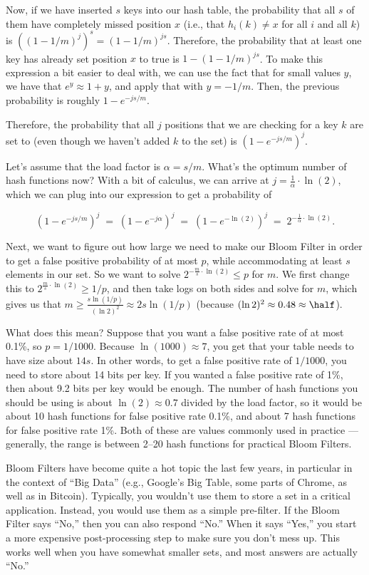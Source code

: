 Now, if we have inserted $s$ keys into our hash table, the probability
that all $s$ of them have completely missed position $x$ (i.e., that
$h_i(k) \neq x$ for all $i$ and all $k$) is $((1-1/m)^j)^s = (1-1/m)^{js}$.
Therefore, the probability that at least one key has already set
position $x$ to true is $1-(1-1/m)^{js}$.
To make this expression a bit easier to deal with, we can use the fact
that for small values $y$, we have that $e^y \approx 1+y$, and apply
that with $y= -1/m$. Then, the previous probability is roughly
$1-e^{-js/m}$.

Therefore, the probability that all $j$ positions that we are checking
for a key $k$ are set to  (even though we haven't added $k$
to the set) is $(1-e^{-js/m})^j$.

Let's assume that the load factor is $\alpha = s/m$. What's the
optimum number of hash functions now? With a bit of calculus, we can
arrive at $j = \frac{1}{\alpha} \cdot \ln(2)$, which we can plug into
our expression to get a probability of 

\[
(1-e^{-js/m})^j
\; = \; (1-e^{-j \alpha})^j
\; = \; (1-e^{- \ln(2)})^j
\; = \; 2^{-\frac{1}{\alpha} \cdot \ln(2)}.
\]

Next, we want to figure out how large we need to make our Bloom Filter
in order to get a false positive probability of at most $p$, while
accommodating at least $s$ elements in our set. So we want to solve
$2^{-\frac{m}{s} \cdot \ln(2)} \leq p$ for $m$. We first change this
to $2^{\frac{m}{s} \cdot \ln(2)} \geq 1/p$, and then take logs on both
sides and solve for $m$, which gives us that
$m \geq \frac{s \ln(1/p)}{(\ln 2)^2} \approx 2s \ln(1/p)$ (because
$(\ln 2)^2 \approx 0.48 \approx \half$).

What does this mean? Suppose that you want a false positive rate of at
most 0.1\%, so $p = 1/1000$. Because $\ln(1000) \approx 7$, you get
that your table needs to have size about $14s$. In other words, to get
a false positive rate of $1/1000$, you need to store about 14 bits per
key. If you wanted a false positive rate of 1\%, then about 9.2 bits
per key would be enough. The number of hash functions you should be
using is about $\ln(2) \approx 0.7$ divided by the load factor, so it
would be about 10 hash functions for false positive rate 0.1\%, and
about 7 hash functions for false positive rate 1\%. Both of these are
values commonly used in practice --- generally, the range is between
2--20 hash functions for practical Bloom Filters.

Bloom Filters have become quite a hot topic the last few years, in
particular in the context of ``Big Data'' (e.g., Google's Big Table,
some parts of Chrome, as well as in Bitcoin). Typically, you wouldn't
use them to store a set in a critical application. Instead, you would
use them as a simple pre-filter. If the Bloom Filter says ``No,'' then
you can also respond ``No.'' When it says ``Yes,'' you start a more
expensive post-processing step to make sure you don't mess up. This
works well when you have somewhat smaller sets, and most answers are
actually ``No.''

